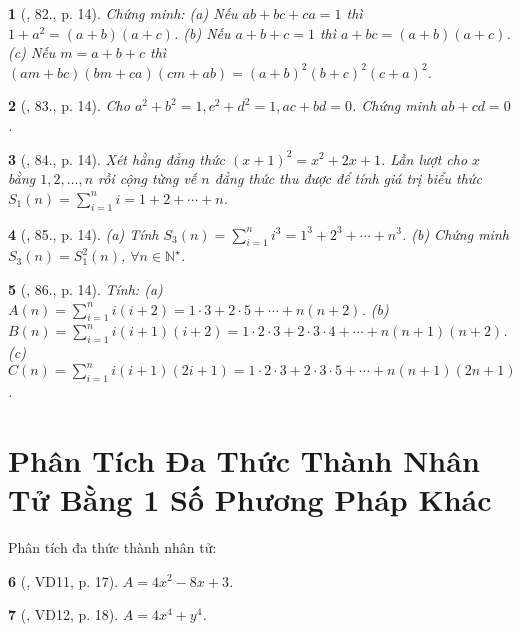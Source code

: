 \documentclass{article}
\newtheorem{baitoan}{}
\begin{document}
\begin{baitoan}[\cite{Binh_Toan_8_tap_1}, 82., p. 14]
	Chứng minh: (a) Nếu $ab + bc + ca = 1$ thì $1 + a^2 = (a + b)(a + c)$. (b) Nếu $a + b + c = 1$ thì $a + bc = (a + b)(a + c)$. (c) Nếu $m = a + b + c$ thì $(am + bc)(bm + ca)(cm + ab) = (a + b)^2(b + c)^2(c + a)^2$.
\end{baitoan}

\begin{baitoan}[\cite{Binh_Toan_8_tap_1}, 83., p. 14]
	Cho $a^2 + b^2 = 1,c^2 + d^2 = 1,ac + bd = 0$. Chứng minh $ab + cd = 0$.
\end{baitoan}

\begin{baitoan}[\cite{Binh_Toan_8_tap_1}, 84., p. 14]
	Xét hằng đẳng thức $(x + 1)^2 = x^2 + 2x + 1$. Lần lượt cho $x$ bằng $1,2,\ldots,n$ rồi cộng từng vế $n$ đẳng thức thu được để tính giá trị biểu thức $S_1(n) = \sum_{i=1}^n i = 1 + 2 + \cdots + n$.
\end{baitoan}

\begin{baitoan}[\cite{Binh_Toan_8_tap_1}, 85., p. 14]
	(a) Tính $S_3(n) = \sum_{i=1}^n i^3 = 1^3 + 2^3 + \cdots + n^3$. (b) Chứng minh $S_3(n) = S_1^2(n)$, $\forall n\in\mathbb{N}^\star$.
\end{baitoan}

\begin{baitoan}[\cite{Binh_Toan_8_tap_1}, 86., p. 14]
	Tính: (a) $A(n) = \sum_{i=1}^n i(i + 2) = 1\cdot3 + 2\cdot5 + \cdots + n(n + 2)$. (b) $B(n) = \sum_{i=1}^n i(i + 1)(i + 2) = 1\cdot2\cdot3 + 2\cdot3\cdot4 + \cdots + n(n + 1)(n + 2)$. (c) $C(n) = \sum_{i=1}^n i(i + 1)(2i + 1) = 1\cdot2\cdot3 + 2\cdot3\cdot5 + \cdots + n(n + 1)(2n + 1)$.
\end{baitoan}


\section{Phân Tích Đa Thức Thành Nhân Tử Bằng 1 Số Phương Pháp Khác}
Phân tích đa thức thành nhân tử:

\begin{baitoan}[\cite{Tuyen_Toan_8}, VD11, p. 17]
	$A = 4x^2 - 8x + 3$.
\end{baitoan}

\begin{baitoan}[\cite{Tuyen_Toan_8}, VD12, p. 18]
	$A = 4x^4 + y^4$.
\end{baitoan}
\end{document}
